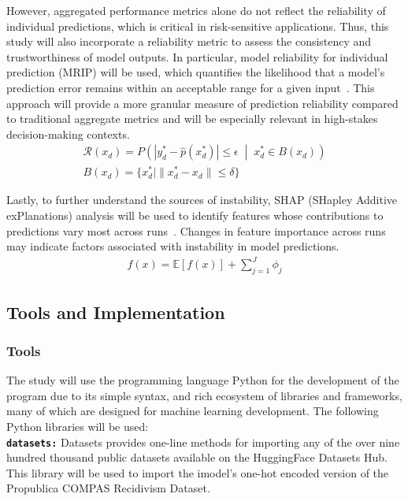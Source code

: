\documentclass{article}
\begin{document}
However, aggregated performance metrics alone do not reflect the reliability of individual predictions, which is critical in risk-sensitive applications. Thus, this study will also incorporate a reliability metric to assess the consistency and trustworthiness of model outputs. In particular, model reliability for individual prediction (MRIP) will be used, which quantifies the likelihood that a model's prediction error remains within an acceptable range for a given input~\cite{zhang2024reliability}. This approach will provide a more granular measure of prediction reliability compared to traditional aggregate metrics and will be especially relevant in high-stakes decision-making contexts.
\begin{align}
  \mathcal{R}(x_d) =
  P\left(
  \left| y_d^* - \hat{p}(x_d^*) \right| \le \epsilon
  \;\middle|\;
  x_d^* \in B(x_d)
  \right) \\
  B(x_d) = \{ x_d^* \mid \| x_d^* - x_d \| \le \delta \}
\end{align}

Lastly, to further understand the sources of instability, SHAP (SHapley Additive exPlanations) analysis will be used to identify features whose contributions to predictions vary most across runs~\cite{ponce2024practical}. Changes in feature importance across runs may indicate factors associated with instability in model predictions.
\begin{align}
  f(x) = \mathbb{E}[f(x)] + \sum_{j=1}^{J} \phi_j
\end{align}

\subsection{Tools and Implementation} 
\tab%
\subsubsection{Tools}
The study will use the programming language Python for the development of the program due to its simple syntax, and rich ecosystem of libraries and frameworks, many of which are designed for machine learning development. The following Python libraries will be used: \\

\textbf{\texttt{datasets:}} Datasets provides one-line methods for importing any of the over nine hundred thousand public datasets available on the HuggingFace Datasets Hub. This library will be used to import the imodel's one-hot encoded version of the Propublica COMPAS Recidivism Dataset.
\end{document}
